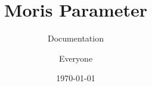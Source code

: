 \documentclass{scrreprt}
\title{Moris Parameter}
\subtitle{Documentation}
\date{\today}
\author{Everyone}
\begin{document}
\maketitle
\tableofcontents
\listoftodos


% 

% 

% 


% 
\end{document}
